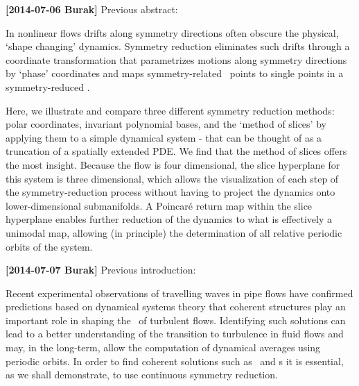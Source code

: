 {\bf[2014-07-06 Burak]} Previous abstract:

In nonlinear flows drifts along symmetry directions often obscure the
physical, `shape changing' dynamics. Symmetry reduction eliminates such
drifts through a coordinate transformation that parametrizes motions along
symmetry directions by `phase' coordinates and maps symmetry-related \statesp\ points
to single points in a symmetry-reduced \statesp. 

Here, we illustrate and compare
three different symmetry reduction methods: polar coordinates, invariant
polynomial bases, and the `{method of slices}' by applying them to a
simple dynamical system
%
%
%
 - that can be thought of as a truncation of a spatially extended PDE. We find that the {method
of slices} offers the most insight.  Because the flow is four dimensional,
the slice hyperplane for this system is three dimensional, which allows
the visualization of each step of the symmetry-reduction process without having to
project the dynamics onto lower-dimensional submanifolds. A Poincar\'e return
map within the slice hyperplane enables further reduction of the dynamics to what is effectively a unimodal map, allowing (in principle) the determination of all relative periodic orbits of the system.

{\bf[2014-07-07 Burak]} Previous introduction:

Recent experimental observations of travelling waves in pipe flows have confirmed predictions based on dynamical systems theory that coherent structures play an important role in shaping the \statesp\ of turbulent flows. Identifying such solutions can lead to a better
understanding of the transition to turbulence in fluid flows and may, in the long-term,
allow the computation of dynamical averages using periodic orbits. In order to
find coherent solutions such as \reqva\ and \rpo s it is essential, as we shall demonstrate,
to use continuous symmetry reduction.

